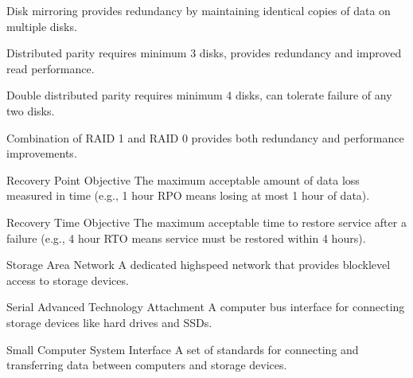 \documentclass[letterpaper,10pt,english]{sphinxmanual}
\begin{document}
\begin{description}
\sphinxAtStartPar
Disk mirroring \sphinxhyphen{} provides redundancy by maintaining identical copies of data on multiple disks.

\sphinxAtStartPar
Distributed parity \sphinxhyphen{} requires minimum 3 disks, provides redundancy and improved read performance.

\sphinxAtStartPar
Double distributed parity \sphinxhyphen{} requires minimum 4 disks, can tolerate failure of any two disks.

\sphinxAtStartPar
Combination of RAID 1 and RAID 0 \sphinxhyphen{} provides both redundancy and performance improvements.

\sphinxAtStartPar
Recovery Point Objective \sphinxhyphen{} The maximum acceptable amount of data loss measured in time (e.g., 1 hour RPO means losing at most 1 hour of data).

\sphinxAtStartPar
Recovery Time Objective \sphinxhyphen{} The maximum acceptable time to restore service after a failure (e.g., 4 hour RTO means service must be restored within 4 hours).

\sphinxAtStartPar
Storage Area Network \sphinxhyphen{} A dedicated high\sphinxhyphen{}speed network that provides block\sphinxhyphen{}level access to storage devices.

\sphinxAtStartPar
Serial Advanced Technology Attachment \sphinxhyphen{} A computer bus interface for connecting storage devices like hard drives and SSDs.

\sphinxAtStartPar
Small Computer System Interface \sphinxhyphen{} A set of standards for connecting and transferring data between computers and storage devices.


\end{description}
\end{document}
